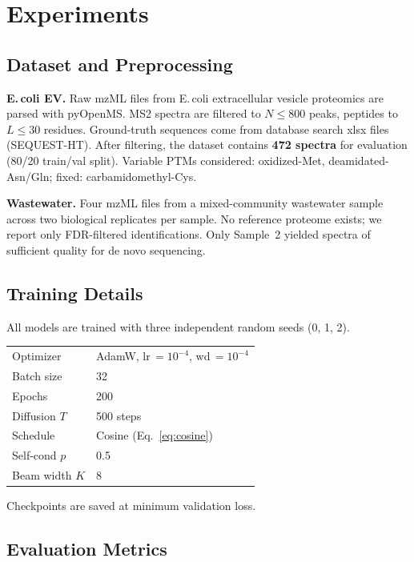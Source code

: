 \documentclass[10pt,twocolumn]{article}
\begin{document}
\section{Experiments}

\subsection{Dataset and Preprocessing}

\textbf{E.\,coli EV.} Raw mzML files from E.\,coli extracellular vesicle proteomics are
parsed with pyOpenMS.
MS2 spectra are filtered to $N \leq 800$ peaks, peptides to $L \leq 30$ residues.
Ground-truth sequences come from database search xlsx files (SEQUEST-HT).
After filtering, the dataset contains \textbf{472 spectra} for evaluation (80/20 train/val split).
Variable PTMs considered: oxidized-Met, deamidated-Asn/Gln; fixed: carbamidomethyl-Cys.

\textbf{Wastewater.} Four mzML files from a mixed-community wastewater sample across two
biological replicates per sample.
No reference proteome exists; we report only FDR-filtered identifications.
Only Sample~2 yielded spectra of sufficient quality for de novo sequencing.

\subsection{Training Details}

All models are trained with three independent random seeds (0, 1, 2).
\begin{center}
\begin{tabular}{ll}
  \toprule
  Optimizer      & AdamW, lr\,$=10^{-4}$, wd\,$=10^{-4}$ \\
  Batch size     & 32 \\
  Epochs         & 200 \\
  Diffusion $T$  & 500 steps \\
  Schedule       & Cosine (Eq.~\ref{eq:cosine}) \\
  Self-cond $p$  & 0.5 \\
  Beam width $K$ & 8 \\
  \bottomrule
\end{tabular}
\end{center}
Checkpoints are saved at minimum validation loss.

\subsection{Evaluation Metrics}
\end{document}
